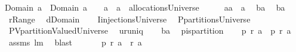 \begin{isabellebody}
{\isachardoublequoteopen}Domain\ a{}\ {\isasyminter}\ {\isacharparenleft}Domain\ a{}{\isacharparenright}\ {\isacharequal}\ {\isacharbraceleft}{\isacharbraceright}{\isachardoublequoteclose}\ \ {\isachardoublequoteopen}a{}\ {\isasymunion}\ a{}\ {\isasymin}\ allocationsUniverse{\isachardoublequoteclose}\isanewline
%
\isadelimproof
%
\endisadelimproof
%
\isatagproof
{}\isamarkupfalse%
\ {\isacharminus}\isanewline
\ \ \isamarkupfalse%
\ {\isacharquery}a{\isacharequal}{\isachardoublequoteopen}a{}\ {\isasymunion}\ a{}{\isachardoublequoteclose}\ \isamarkupfalse%
\ {\isacharquery}b{}{\isacharequal}{\isachardoublequoteopen}a{}{\isacharcircum}{\isacharminus}{}{\isachardoublequoteclose}\ \isamarkupfalse%
\ {\isacharquery}b{}{\isacharequal}{\isachardoublequoteopen}a{}{\isacharcircum}{\isacharminus}{}{\isachardoublequoteclose}\ \isamarkupfalse%
\ {\isacharquery}r{\isacharequal}Range\ \isamarkupfalse%
\ {\isacharquery}d{\isacharequal}Domain\isanewline
\ \ \isamarkupfalse%
\ {\isacharquery}I{\isacharequal}injectionsUniverse\ \isamarkupfalse%
\ {\isacharquery}P{\isacharequal}partitionsUniverse\ \isamarkupfalse%
\ {\isacharquery}PV{\isacharequal}partitionValuedUniverse\ \isamarkupfalse%
\ {\isacharquery}u{\isacharequal}runiq\isanewline
\ \ \isamarkupfalse%
\ {\isacharquery}b{\isacharequal}{\isachardoublequoteopen}{\isacharquery}a{\isacharcircum}{\isacharminus}{}{\isachardoublequoteclose}\ \isamarkupfalse%
\ {\isacharquery}p{\isacharequal}is{\isacharunderscore}partition\isanewline
\ \ \isamarkupfalse%
\ {\isachardoublequoteopen}{\isacharquery}p\ {\isacharparenleft}{\isacharquery}r\ a{}{\isacharparenright}\ {\isacharampersand}\ {\isacharquery}p\ {\isacharparenleft}{\isacharquery}r\ a{}{\isacharparenright}{\isachardoublequoteclose}\ \isamarkupfalse%
\ assms\ lm{}{}\ \isamarkupfalse%
\ blast\ \isamarkupfalse%
\isanewline
\ \ \isamarkupfalse%
\ \isamarkupfalse%
\ {\isachardoublequoteopen}{\isacharquery}p\ {\isacharparenleft}{\isacharquery}r\ a{}\ {\isasymunion}\ {\isacharquery}r\ a{}{\isacharparenright}{\isachardoublequoteclose}\ \isamarkupfalse%

\end{isabellebody}
